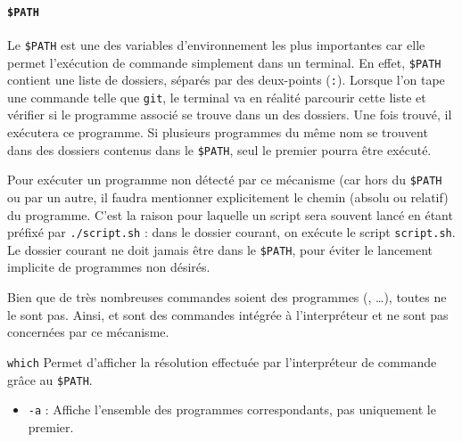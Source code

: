 \paragraph{\texttt{\$PATH}}
Le \texttt{\$PATH} est une des variables d'environnement les plus importantes car elle permet l'exécution de commande simplement dans un terminal. \newline
En effet, \texttt{\$PATH} contient une liste de dossiers, séparés par des deux-points (\texttt{:}). Lorsque l'on tape une commande telle que \texttt{git}, le terminal va en réalité parcourir cette liste et vérifier si le programme associé se trouve dans un des dossiers. Une fois trouvé, il exécutera ce programme. Si plusieurs programmes du même nom se trouvent dans des dossiers contenus dans le \texttt{\$PATH}, seul le premier pourra être exécuté.

Pour exécuter un programme non détecté par ce mécanisme (car hors du \texttt{\$PATH} ou  par un autre, il faudra mentionner explicitement le chemin (absolu ou relatif) du programme. C'est la raison pour laquelle un script sera souvent lancé en étant préfixé par \texttt{./script.sh} : dans le dossier courant, on exécute le script \texttt{script.sh}. Le dossier courant ne doit jamais être dans le \texttt{\$PATH}, pour éviter le lancement implicite de programmes non désirés.

 Bien que de très nombreuses commandes soient des programmes (, \dots), toutes ne le sont pas. Ainsi,  et  sont des commandes intégrée à l'interpréteur et ne sont pas concernées par ce mécanisme.

\texttt{which} 
Permet d'afficher la résolution effectuée par l'interpréteur de commande grâce au \texttt{\$PATH}.
\begin{itemize}
    \item \texttt{-a} : Affiche l'ensemble des programmes correspondants, pas uniquement le premier.
\end{itemize}

